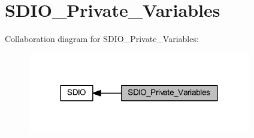 \hypertarget{group___s_d_i_o___private___variables}{}\section{S\+D\+I\+O\+\_\+\+Private\+\_\+\+Variables}
\label{group___s_d_i_o___private___variables}
Collaboration diagram for S\+D\+I\+O\+\_\+\+Private\+\_\+\+Variables\+:
\nopagebreak
\begin{figure}[H]
\begin{center}
\leavevmode
\includegraphics[width=276pt]{group___s_d_i_o___private___variables}
\end{center}
\end{figure}
